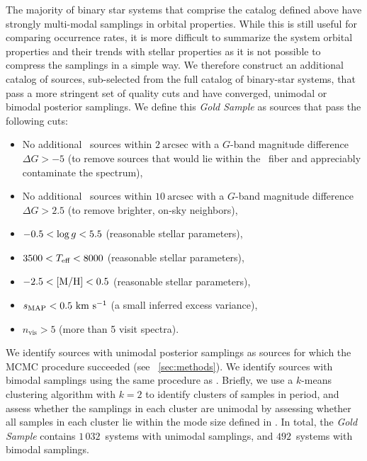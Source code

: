 \documentclass[modern]{aastex63}
\newcommand{\ngold}{\ensuremath{1\,032}}
\newcommand{\nbimodal}{\ensuremath{492}}
\begin{document}
The majority of binary star systems that comprise the catalog defined above have
strongly multi-modal samplings in orbital properties.
While this is still useful for comparing occurrence rates, it is more difficult
to summarize the system orbital properties and their trends with stellar
properties as it is not possible to compress the samplings in a simple way.
We therefore construct an additional catalog of sources, sub-selected from the
full catalog of binary-star systems, that pass a more stringent set of quality
cuts and have converged, unimodal or bimodal posterior samplings.
We define this \textit{Gold Sample} as sources that pass the following cuts:
\begin{itemize}
    \item No additional \gaia\ sources within $2~\textrm{arcsec}$ with a
          $G$-band magnitude difference $\Delta G > -5$ (to remove sources that
          would lie within the \apogee\ fiber and appreciably contaminate the
          spectrum),
    \item No additional \gaia\ sources within $10~\textrm{arcsec}$ with a
          $G$-band magnitude difference $\Delta G > 2.5$ (to remove brighter,
          on-sky neighbors),
    \item $-0.5 < \log g < 5.5$ (reasonable stellar parameters),
    \item $3500 < T_{\textrm{eff}} < 8000$ (reasonable stellar parameters),
    \item $-2.5 < {[{\rm M}/{\rm H}]} < 0.5$ (reasonable stellar parameters),
    \item $s_{\textrm{MAP}} < 0.5~\mathrm{km}~\mathrm{s}^{-1}$ (a small inferred excess variance),
    \item $n_{\textrm{vis}} > 5$ (more than 5 visit spectra).
\end{itemize}

We identify sources with unimodal posterior samplings as sources for which the
MCMC procedure succeeded (see \sectionname~\ref{sec:methods}).
We identify sources with bimodal samplings using the same procedure as
\cite{Price-Whelan:2018}.
Briefly, we use a $k$-means clustering algorithm with $k=2$ to identify clusters
of samples in period, and assess whether the samplings in each cluster are
unimodal by assessing whether all samples in each cluster lie within the mode
size defined in \cite{thejoker}.
In total, the \textit{Gold Sample} contains \ngold\ systems with unimodal
samplings, and \nbimodal\ systems with bimodal samplings.
\end{document}
